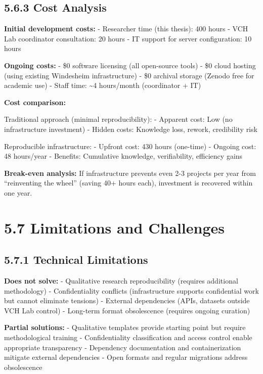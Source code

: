 \documentclass[
  oneside,
  open=any]{scrbook}
\begin{document}
\subsection{5.6.3 Cost Analysis}\label{cost-analysis}

\textbf{Initial development costs:} - Researcher time (this thesis): 400
hours - VCH Lab coordinator consultation: 20 hours - IT support for
server configuration: 10 hours

\textbf{Ongoing costs:} - \$0 software licensing (all open-source tools)
- \$0 cloud hosting (using existing Windesheim infrastructure) - \$0
archival storage (Zenodo free for academic use) - Staff time:
\textasciitilde4 hours/month (coordinator + IT)

\textbf{Cost comparison:}

Traditional approach (minimal reproducibility): - Apparent cost: Low (no
infrastructure investment) - Hidden costs: Knowledge loss, rework,
credibility risk

Reproducible infrastructure: - Upfront cost: 430 hours (one-time) -
Ongoing cost: 48 hours/year - Benefits: Cumulative knowledge,
verifiability, efficiency gains

\textbf{Break-even analysis:} If infrastructure prevents even 2-3
projects per year from ``reinventing the wheel'' (saving 40+ hours
each), investment is recovered within one year.

\section{5.7 Limitations and
Challenges}\label{limitations-and-challenges}

\subsection{5.7.1 Technical Limitations}\label{technical-limitations}

\textbf{Does not solve:} - Qualitative research reproducibility
(requires additional methodology) - Confidentiality conflicts
(infrastructure supports confidential work but cannot eliminate
tensions) - External dependencies (APIs, datasets outside VCH Lab
control) - Long-term format obsolescence (requires ongoing curation)

\textbf{Partial solutions:} - Qualitative templates provide starting
point but require methodological training - Confidentiality
classification and access control enable appropriate transparency -
Dependency documentation and containerization mitigate external
dependencies - Open formats and regular migrations address obsolescence
\end{document}
